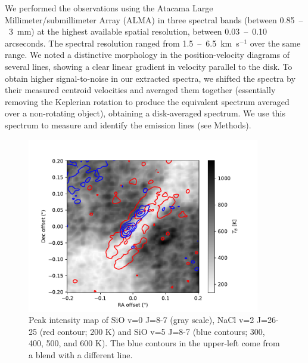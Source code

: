 \documentclass[12pt]{article}
\newcommand{\bam}[1]{\textcolor{green!65!black}{\textbf{[BAM: #1]}}}
\newcommand{\kms}{\textrm{km~s}\ensuremath{^{-1}}\xspace}	%
\begin{document}


We performed the observations using the Atacama Large Millimeter/submillimeter
Array (ALMA) in three spectral bands (between 0.85~--~3~mm) at the highest
available spatial resolution, between 0.03~--~0.10 arcseconds. The spectral
resolution ranged from 1.5~--~6.5~\kms over the same range.  We noted a
distinctive morphology in the position-velocity diagrams of several lines,
showing a clear linear gradient in velocity parallel to the disk. To obtain
higher signal-to-noise in our extracted spectra, we shifted the spectra by
their measured centroid velocities and averaged them together (essentially
removing  the Keplerian rotation to produce the equivalent spectrum averaged
over a non-rotating object), obtaining a disk-averaged spectrum.  We use this
spectrum to measure and  identify the emission lines (see Methods).


\begin{figure}[!htp]
\includegraphics[scale=1,width=4in]{figures/SiO_8-7_on_NaClv=2_26-25.pdf}
\caption{Peak intensity map of SiO v=0 J=8-7 (gray scale), NaCl v=2 J=26-25
(red contour; 200 K) and {SiO v=5 J=8-7} (blue contours; 300, 400, 500, and 600
K).  The blue contours in the upper-left come from a blend with a different
line.
}
\label{fig:sioonnacl}
\end{figure}
\end{document}
